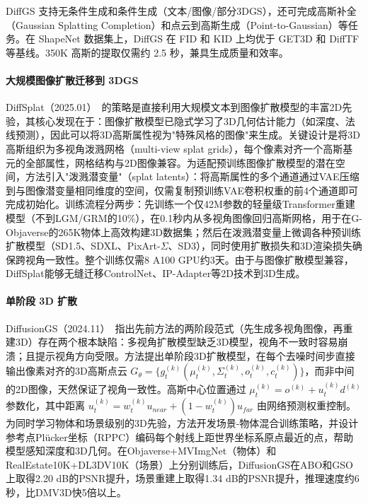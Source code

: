 DiffGS 支持无条件生成和条件生成（文本/图像/部分3DGS），还可完成高斯补全（Gaussian Splatting Completion）和点云到高斯生成（Point-to-Gaussian）等任务。在 ShapeNet 数据集上，DiffGS 在 FID 和 KID 上均优于 GET3D 和 DiffTF 等基线。350K 高斯的提取仅需约 2.5 秒，兼具生成质量和效率。

\paragraph{大规模图像扩散迁移到 3DGS}

DiffSplat（2025.01）~\cite{2501_16764}的策略是直接利用大规模文本到图像扩散模型的丰富2D先验，其核心发现在于：图像扩散模型已隐式学习了3D几何估计能力（如深度、法线预测），因此可以将3D高斯属性视为"特殊风格的图像"来生成。关键设计是将3D高斯组织为多视角泼溅网格（multi-view splat grids），每个像素对齐一个高斯基元的全部属性，网格结构与2D图像兼容。为适配预训练图像扩散模型的潜在空间，方法引入"泼溅潜变量"（splat latents）：将高斯属性的多个通道通过VAE压缩到与图像潜变量相同维度的空间，仅需复制预训练VAE卷积权重的前4个通道即可完成初始化。训练流程分两步：先训练一个仅42M参数的轻量级Transformer重建模型（不到LGM/GRM的10\%），在0.1秒内从多视角图像回归高斯网格，用于在G-Objaverse的265K物体上高效构建3D数据集；然后在泼溅潜变量上微调各种预训练扩散模型（SD1.5、SDXL、PixArt-$\Sigma$、SD3），同时使用扩散损失和3D渲染损失确保跨视角一致性。整个训练仅需8 A100 GPU约3天。由于与图像扩散模型兼容，DiffSplat能够无缝迁移ControlNet、IP-Adapter等2D技术到3D生成。

\paragraph{单阶段 3D 扩散}

DiffusionGS（2024.11）~\cite{2411_14384}指出先前方法的两阶段范式（先生成多视角图像，再重建3D）存在两个根本缺陷：多视角扩散模型缺乏3D模型，视角不一致时容易崩溃；且提示视角方向受限。方法提出单阶段3D扩散模型，在每个去噪时间步直接输出像素对齐的3D高斯点云 $G_\theta = \{g_t^{(k)}(\mu_t^{(k)}, \Sigma_t^{(k)}, o_t^{(k)}, c_t^{(k)})\}$，而非中间的2D图像，天然保证了视角一致性。高斯中心位置通过 $\mu_t^{(k)} = o^{(k)} + u_t^{(k)} d^{(k)}$ 参数化，其中距离 $u_t^{(k)} = w_t^{(k)} u_{near} + (1-w_t^{(k)}) u_{far}$ 由网络预测权重控制。为同时学习物体和场景级别的3D先验，方法开发场景-物体混合训练策略，并设计参考点Pl\"ucker坐标（RPPC）编码每个射线上距世界坐标系原点最近的点，帮助模型感知深度和3D几何。在Objaverse+MVImgNet（物体）和RealEstate10K+DL3DV10K（场景）上分别训练后，DiffusionGS在ABO和GSO上取得2.20 dB的PSNR提升，场景重建上取得1.34 dB的PSNR提升，推理速度约6秒，比DMV3D快5倍以上。

